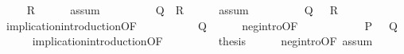 \begin{isabellebody}
%
\isadelimproof
%
\endisadelimproof
%
\isatagproof
{}\isamarkupfalse%
{\isacharminus}{\kern0pt}\isanewline
\ \ \isamarkupfalse%
\ {}{\isacharcolon}{\kern0pt}\ {\isachardoublequoteopen}{\isasymnot}R{\isachardoublequoteclose}\isanewline
\ \ \ \ \isamarkupfalse%
\ assum{}\isanewline
\ \ \ \ \isacommand{{\isachardot}{\kern0pt}}\isamarkupfalse%
\isanewline
\ \ \isamarkupfalse%
\ {}{\isacharcolon}{\kern0pt}\ {\isachardoublequoteopen}Q\ {\isasymlongrightarrow}\ R{\isachardoublequoteclose}\isanewline
\ \ \ \ \isamarkupfalse%
\ assum{}\isanewline
\ \ \ \ \isacommand{{\isachardot}{\kern0pt}}\isamarkupfalse%
\isanewline
\ \ \isamarkupfalse%
\ {}{\isacharcolon}{\kern0pt}\ {\isachardoublequoteopen}Q\ {\isasymlongrightarrow}\ {\isasymnot}\ R{\isachardoublequoteclose}\isanewline
\ \ \ \ \isamarkupfalse%
\ implication{\isacharunderscore}{\kern0pt}introduction{\isacharbrackleft}{\kern0pt}OF\ {}{\isacharbrackright}{\kern0pt}\isanewline
\ \ \ \ \isacommand{{\isachardot}{\kern0pt}}\isamarkupfalse%
\isanewline
\ \ \isamarkupfalse%
\ {}{\isacharcolon}{\kern0pt}\ {\isachardoublequoteopen}{\isasymnot}Q{\isachardoublequoteclose}\isanewline
\ \ \ \ \isamarkupfalse%
\ neg{\isacharunderscore}{\kern0pt}intro{\isacharbrackleft}{\kern0pt}OF\ {}\ {}{\isacharbrackright}{\kern0pt}\isanewline
\ \ \ \ \isacommand{{\isachardot}{\kern0pt}}\isamarkupfalse%
\isanewline
\ \ \isamarkupfalse%
\ {}{\isacharcolon}{\kern0pt}\ {\isachardoublequoteopen}P\ {\isasymlongrightarrow}\ {\isasymnot}\ Q{\isachardoublequoteclose}\isanewline
\ \ \ \ \isamarkupfalse%
\ implication{\isacharunderscore}{\kern0pt}introduction{\isacharbrackleft}{\kern0pt}OF\ {}{\isacharbrackright}{\kern0pt}\isanewline
\ \ \ \ \isacommand{{\isachardot}{\kern0pt}}\isamarkupfalse%
\isanewline
\ \ \isamarkupfalse%
\ {\isacharquery}{\kern0pt}thesis\isanewline
\ \ \ \ \isamarkupfalse%
\ neg{\isacharunderscore}{\kern0pt}intro{\isacharbrackleft}{\kern0pt}OF\ assum{}\ {}{\isacharbrackright}{\kern0pt}\isanewline
\ \ \ \ \isacommand{{\isachardot}{\kern0pt}}\isamarkupfalse%
\isanewline
{}\isamarkupfalse%
%
\endisatagproof
{\isafoldproof}%
%
\isadelimproof
\isanewline
%
\endisadelimproof
\isanewline
\isanewline
%
\isadelimtheory
\isanewline
%
\endisadelimtheory
%
\isatagtheory
{}\isamarkupfalse%
%
\endisatagtheory
{\isafoldtheory}%
%
\isadelimtheory
%
\endisadelimtheory
%
\end{isabellebody}%
